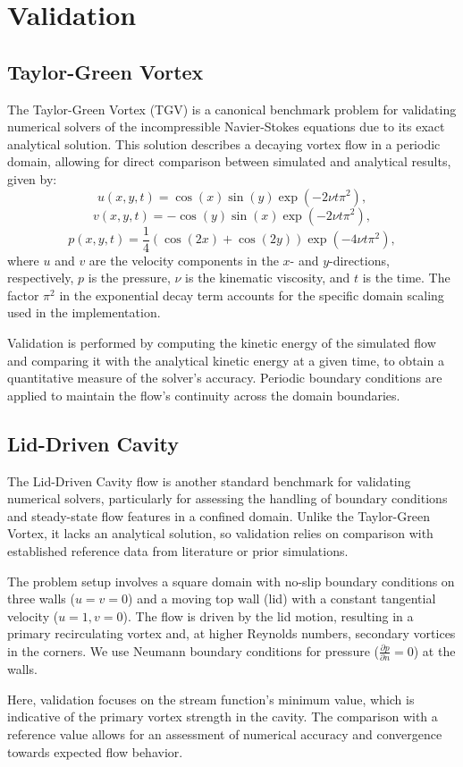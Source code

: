 \section{Validation}

\subsection{Taylor-Green Vortex}
The Taylor-Green Vortex (TGV) is a canonical benchmark problem for validating numerical solvers of the incompressible Navier-Stokes equations due to its exact analytical solution.
This solution describes a decaying vortex flow in a periodic domain, allowing for direct comparison between simulated and analytical results, given by:
\[
u(x, y, t) = \cos(x) \sin(y) \exp(-2 \nu t \pi^2),
\]
\[
v(x, y, t) = -\cos(y) \sin(x) \exp(-2 \nu t \pi^2),
\]
\[
p(x, y, t) = \frac{1}{4} \left( \cos(2x) + \cos(2y) \right) \exp(-4 \nu t \pi^2),
\]
where \( u \) and \( v \) are the velocity components in the \( x \)- and \( y \)-directions, respectively, \( p \) is the pressure, \( \nu \) is the kinematic viscosity, and \( t \) is the time.
The factor \( \pi^2 \) in the exponential decay term accounts for the specific domain scaling used in the implementation.

Validation is performed by computing the kinetic energy of the simulated flow and comparing it with the analytical kinetic energy at a given time, to obtain a quantitative measure of the solver's accuracy.
Periodic boundary conditions are applied to maintain the flow's continuity across the domain boundaries.

\subsection{Lid-Driven Cavity}
The Lid-Driven Cavity flow is another standard benchmark for validating numerical solvers, particularly for assessing the handling of boundary conditions and steady-state flow features in a confined domain.
Unlike the Taylor-Green Vortex, it lacks an analytical solution, so validation relies on comparison with established reference data from literature or prior simulations.

The problem setup involves a square domain with no-slip boundary conditions on three walls (\( u = v = 0 \)) and a moving top wall (lid) with a constant tangential velocity (\( u = 1, v = 0 \)).
The flow is driven by the lid motion, resulting in a primary recirculating vortex and, at higher Reynolds numbers, secondary vortices in the corners.
We use Neumann boundary conditions for pressure (\( \frac{\partial p}{\partial n} = 0 \)) at the walls.

Here, validation focuses on the stream function's minimum value, which is indicative of the primary vortex strength in the cavity.
The comparison with a reference value allows for an assessment of numerical accuracy and convergence towards expected flow behavior.
